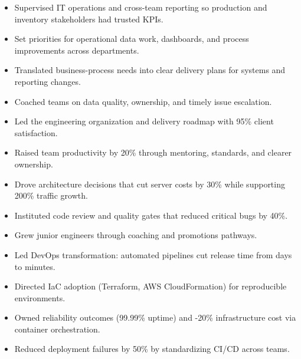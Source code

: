 
\begin{itemize}
\item Supervised IT operations and cross-team reporting so production and inventory stakeholders had trusted KPIs.
\item Set priorities for operational data work, dashboards, and process improvements across departments.
\item Translated business-process needs into clear delivery plans for systems and reporting changes.
\item Coached teams on data quality, ownership, and timely issue escalation.
\end{itemize}
\divider

\begin{itemize}
\item Led the engineering organization and delivery roadmap with 95\% client satisfaction.
\item Raised team productivity by 20\% through mentoring, standards, and clearer ownership.
\item Drove architecture decisions that cut server costs by 30\% while supporting 200\% traffic growth.
\item Instituted code review and quality gates that reduced critical bugs by 40\%.
\item Grew junior engineers through coaching and promotions pathways.
\end{itemize}
\divider

\begin{itemize}
\item Led DevOps transformation: automated pipelines cut release time from days to minutes.
\item Directed IaC adoption (Terraform, AWS CloudFormation) for reproducible environments.
\item Owned reliability outcomes (99.99\% uptime) and -20\% infrastructure cost via container orchestration.
\item Reduced deployment failures by 50\% by standardizing CI/CD across teams.
\end{itemize}
\divider

